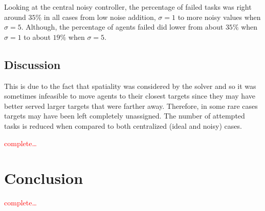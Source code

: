 \documentclass[defaultstyle,12pt]{thesis}
\begin{document}
Looking at the central noisy controller, the percentage of failed tasks was right around $35\%$ in all cases from low noise addition, $\sigma = 1$ to more noisy values when $\sigma = 5$. Although, the percentage of agents failed did lower from about $35\%$ when $\sigma = 1$ to about $19\%$ when $\sigma = 5$.

\section{Discussion}
This is due to the fact that spatiality was considered by the solver and so it was sometimes infeasible to move agents to their closest targets since they may have better served larger targets that were farther away. Therefore, in some rare cases targets may have been left completely unassigned. The number of attempted tasks is reduced when compared to both centralized (ideal and noisy) cases.

\textcolor{red}{complete\ldots}



\chapter{Conclusion}
\textcolor{red}{complete\ldots}

\nocite{*}						%

\end{document}
